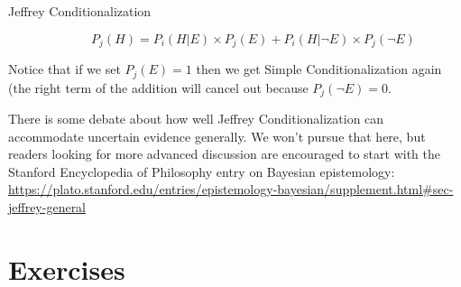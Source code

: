 \documentclass[]{tufte-book}
\begin{document}
\begin{description}
\item[Jeffrey Conditionalization]
\[P_j(H) = P_i(H|E)\times P_j(E) + P_i(H|\neg E)\times P_j(\neg E)\]
\end{description}

Notice that if we set \(P_j(E)=1\) then we get Simple Conditionalization again (the right term of the addition will cancel out because \(P_j(\neg E) = 0\).

There is some debate about how well Jeffrey Conditionalization can accommodate uncertain evidence generally. We won't pursue that here, but readers looking for more advanced discussion are encouraged to start with the Stanford Encyclopedia of Philosophy entry on Bayesian epistemology: \url{https://plato.stanford.edu/entries/epistemology-bayesian/supplement.html\#sec-jeffrey-general}

\hypertarget{exercises-10}{%
\section*{Exercises}\label{exercises-10}}
\end{document}
